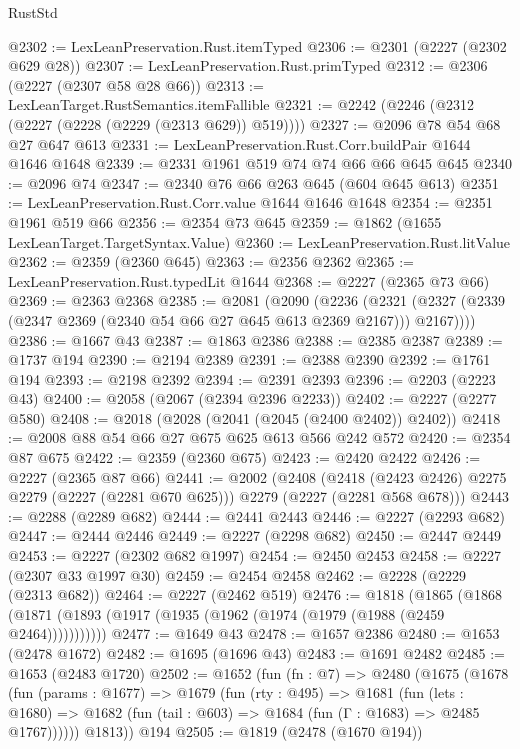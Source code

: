 \begin{lexlean}{RustStd}
\begin{coremodule}
@2302 := LexLeanPreservation.Rust.itemTyped
@2306 := @2301 (@2227 (@2302 @629 @28))
@2307 := LexLeanPreservation.Rust.primTyped
@2312 := @2306 (@2227 (@2307 @58 @28 @66))
@2313 := LexLeanTarget.RustSemantics.itemFallible
@2321 := @2242 (@2246 (@2312 (@2227 (@2228 (@2229 (@2313 @629)) @519))))
@2327 := @2096 @78 @54 @68 @27 @647 @613
@2331 := LexLeanPreservation.Rust.Corr.buildPair @1644 @1646 @1648
@2339 := @2331 @1961 @519 @74 @74 @66 @66 @645 @645
@2340 := @2096 @74
@2347 := @2340 @76 @66 @263 @645 (@604 @645 @613)
@2351 := LexLeanPreservation.Rust.Corr.value @1644 @1646 @1648
@2354 := @2351 @1961 @519 @66
@2356 := @2354 @73 @645
@2359 := @1862 (@1655 LexLeanTarget.TargetSyntax.Value)
@2360 := LexLeanPreservation.Rust.litValue
@2362 := @2359 (@2360 @645)
@2363 := @2356 @2362
@2365 := LexLeanPreservation.Rust.typedLit @1644
@2368 := @2227 (@2365 @73 @66)
@2369 := @2363 @2368
@2385 := @2081
    (@2090
      (@2236 (@2321 (@2327 (@2339 (@2347 @2369 (@2340 @54 @66 @27 @645 @613 @2369 @2167))) @2167))))
@2386 := @1667 @43
@2387 := @1863 @2386
@2388 := @2385 @2387
@2389 := @1737 @194
@2390 := @2194 @2389
@2391 := @2388 @2390
@2392 := @1761 @194
@2393 := @2198 @2392
@2394 := @2391 @2393
@2396 := @2203 (@2223 @43)
@2400 := @2058 (@2067 (@2394 @2396 @2233))
@2402 := @2227 (@2277 @580)
@2408 := @2018 (@2028 (@2041 (@2045 (@2400 @2402)) @2402))
@2418 := @2008 @88 @54 @66 @27 @675 @625 @613 @566 @242 @572
@2420 := @2354 @87 @675
@2422 := @2359 (@2360 @675)
@2423 := @2420 @2422
@2426 := @2227 (@2365 @87 @66)
@2441 := @2002
    (@2408
      (@2418 (@2423 @2426) @2275 @2279 (@2227 (@2281 @670 @625)))
      @2279
      (@2227 (@2281 @568 @678)))
@2443 := @2288 (@2289 @682)
@2444 := @2441 @2443
@2446 := @2227 (@2293 @682)
@2447 := @2444 @2446
@2449 := @2227 (@2298 @682)
@2450 := @2447 @2449
@2453 := @2227 (@2302 @682 @1997)
@2454 := @2450 @2453
@2458 := @2227 (@2307 @33 @1997 @30)
@2459 := @2454 @2458
@2462 := @2228 (@2229 (@2313 @682))
@2464 := @2227 (@2462 @519)
@2476 := @1818
    (@1865 (@1868 (@1871 (@1893 (@1917 (@1935 (@1962 (@1974 (@1979 (@1988 (@2459 @2464)))))))))))
@2477 := @1649 @43
@2478 := @1657 @2386
@2480 := @1653 (@2478 @1672)
@2482 := @1695 (@1696 @43)
@2483 := @1691 @2482
@2485 := @1653 (@2483 @1720)
@2502 := @1652
    (fun (fn : @7) =>
    @2480
      (@1675
        (@1678
          (fun (params : @1677) =>
          @1679
            (fun (rty : @495) =>
            @1681
              (fun (lets : @1680) =>
              @1682 (fun (tail : @603) => @1684 (fun (Γ : @1683) => @2485 @1767))))))
        @1813))
    @194
@2505 := @1819 (@2478 (@1670 @194))

\end{coremodule}
\end{lexlean}
